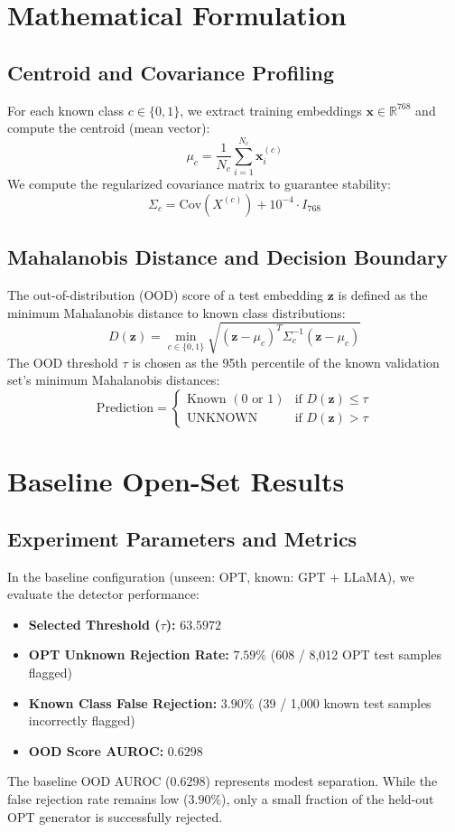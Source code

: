 \documentclass[12pt,a4paper]{report}
\begin{document}
\chapter{Mathematical Formulation}
\label{ch:math}

\section{Centroid and Covariance Profiling}
For each known class $c \in \{0, 1\}$, we extract training embeddings $\mathbf{x} \in \mathbb{R}^{768}$ and compute the centroid (mean vector):
$$\mu_c = \frac{1}{N_c} \sum_{i=1}^{N_c} \mathbf{x}_i^{(c)}$$
We compute the regularized covariance matrix to guarantee stability:
$$\Sigma_c = \text{Cov}(X^{(c)}) + 10^{-4} \cdot I_{768}$$

\section{Mahalanobis Distance and Decision Boundary}
The out-of-distribution (OOD) score of a test embedding $\mathbf{z}$ is defined as the minimum Mahalanobis distance to known class distributions:
$$D(\mathbf{z}) = \min_{c \in \{0, 1\}} \sqrt{(\mathbf{z} - \mu_c)^T \Sigma_c^{-1} (\mathbf{z} - \mu_c)}$$
The OOD threshold $\tau$ is chosen as the 95th percentile of the known validation set's minimum Mahalanobis distances:
$$\text{Prediction} = \begin{cases} \text{Known } (0 \text{ or } 1) & \text{if } D(\mathbf{z}) \le \tau \\ \text{UNKNOWN} & \text{if } D(\mathbf{z}) > \tau \end{cases}$$

\chapter{Baseline Open-Set Results}
\label{ch:baseline_results}

\section{Experiment Parameters and Metrics}
In the baseline configuration (unseen: OPT, known: GPT + LLaMA), we evaluate the detector performance:
\begin{itemize}
    \item \textbf{Selected Threshold ($\tau$):} $63.5972$
    \item \textbf{OPT Unknown Rejection Rate:} $7.59\%$ (608 / 8,012 OPT test samples flagged)
    \item \textbf{Known Class False Rejection:} $3.90\%$ (39 / 1,000 known test samples incorrectly flagged)
    \item \textbf{OOD Score AUROC:} $0.6298$
\end{itemize}
The baseline OOD AUROC ($0.6298$) represents modest separation. While the false rejection rate remains low ($3.90\%$), only a small fraction of the held-out OPT generator is successfully rejected.
\end{document}
